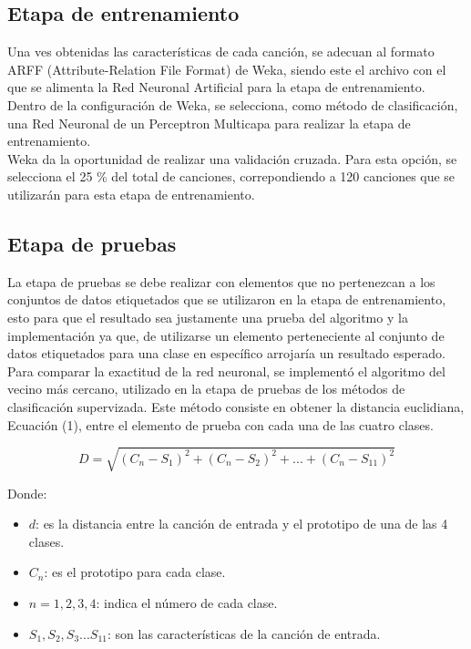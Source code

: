 \documentclass[conference]{IEEEtran}
\begin{document}
\subsection{Etapa de entrenamiento}
Una ves obtenidas las características de cada canción, se adecuan al formato ARFF (Attribute-Relation File Format) de Weka, siendo este el archivo con el que se alimenta la Red Neuronal Artificial para la etapa de entrenamiento.\\
Dentro de la configuración de Weka, se selecciona, como método de clasificación, una Red Neuronal de un Perceptron Multicapa para realizar la etapa de entrenamiento.\\

Weka da la oportunidad de realizar una validación cruzada. Para esta opción, se selecciona el 25 \% del total de canciones, correpondiendo a 120 canciones que se utilizarán para esta etapa de entrenamiento.



\subsection{Etapa de pruebas}
La etapa de pruebas se debe realizar con elementos que no pertenezcan a los conjuntos de datos etiquetados que se utilizaron en la etapa de entrenamiento, esto para que el resultado sea justamente una prueba del algoritmo y la implementaci\'on ya que, de utilizarse un elemento perteneciente al conjunto de datos etiquetados para una clase en espec\'ifico arrojar\'ia un resultado esperado.\\

Para comparar la exactitud de la red neuronal, se implementó el algoritmo del vecino m\'as cercano, utilizado en la etapa de pruebas de los métodos de clasificación supervizada. Este m\'etodo consiste en obtener la distancia euclidiana, Ecuaci\'on (1), entre el elemento de prueba con cada una de las cuatro clases.

\begin{equation}
	D = \sqrt{ (C_n - S_{1} )^2 + (C_n - S_{2} )^2 + ... + (C_n - S_{11} )^2 }
\end{equation}

Donde:\\
\begin{itemize}
	\item $d$: es la distancia entre la canción de entrada y el prototipo de una de las 4 clases.
	\item $C_n$: es el prototipo para cada clase.
	\item $n = 1, 2, 3, 4$: indica el número de cada clase.
	\item $S_{1}, S_{2}, S_{3} ... S_{11}$: son las características de la canción de entrada. \\
\end{itemize}
\end{document}

